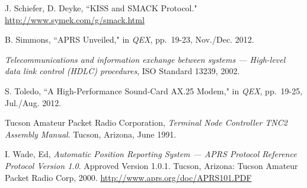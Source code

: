 \begin{thebibliography}{99}
		J. Schiefer, D. Deyke,
		``KISS and SMACK Protocol."
		\url{http://www.symek.com/g/smack.html}

		B. Simmons,
		``APRS Unveiled," in \emph{QEX},
		pp.~19-23,
		Nov./Dec. 2012.

		\emph{Telecommunications and information
			exchange between systems --- High-level data link control (HDLC)
		procedures}, ISO Standard 13239, 2002.

		S. Toledo,
		``A High-Performance Sound-Card AX.25 Modem," in \emph{QEX},
		pp.~19-25, Jul./Aug. 2012.

		Tucson Amateur Packet Radio Corporation,
		\emph{Terminal Node Controller TNC2 Assembly Manual}.
		Tucson, Arizona,
		June 1991.

		I. Wade, Ed,
		\emph{Automatic Position Reporting System --- 
		APRS Protocol Reference Protocol Version 1.0}.
		Approved Version 1.0.1.
		Tucson, Arizona: Tucson Amateur Packet Radio Corp, 2000. 
		\url{http://www.aprs.org/doc/APRS101.PDF}


\end{thebibliography}

